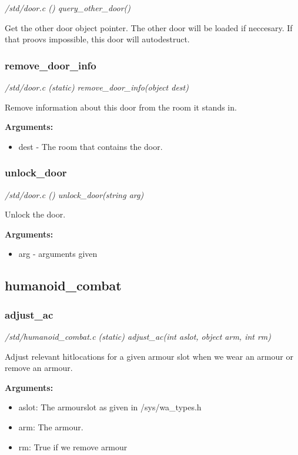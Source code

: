 {\em /std/door.c () query\_other\_door()}

Get the other door object pointer. The other
door will be loaded if neccesary. If that proovs
impossible, this door will autodestruct.


\subsubsection{remove\_door\_info}

{\em /std/door.c (static) remove\_door\_info(object dest)}

Remove information about this door from the room it
stands in.

{\bf Arguments:}
\begin{itemize}
\item     dest - The room that contains the door.
\end{itemize}


\subsubsection{unlock\_door}

{\em /std/door.c () unlock\_door(string arg)}

Unlock the door.

{\bf Arguments:}
\begin{itemize}
\item     arg - arguments given
\end{itemize}


\subsection{humanoid\_combat}
\subsubsection{adjust\_ac}

{\em /std/humanoid\_combat.c (static) adjust\_ac(int aslot, object arm, int rm)}

Adjust relevant hitlocations for a given armour slot
when we wear an armour or remove an armour.

{\bf Arguments:}
\begin{itemize}
\item     aslot: The armourslot as given in /sys/wa\_types.h
\item arm:   The armour.
\item rm:    True if we remove armour
\end{itemize}



